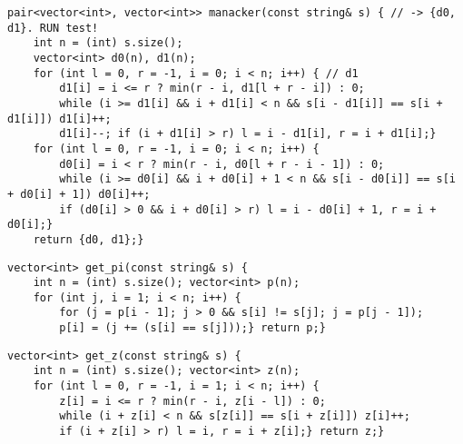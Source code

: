 \documentclass[12pt]{article}
\begin{document}
\begin{verbatim}
pair<vector<int>, vector<int>> manacker(const string& s) { // -> {d0, d1}. RUN test!
    int n = (int) s.size();
    vector<int> d0(n), d1(n);
    for (int l = 0, r = -1, i = 0; i < n; i++) { // d1
        d1[i] = i <= r ? min(r - i, d1[l + r - i]) : 0;
        while (i >= d1[i] && i + d1[i] < n && s[i - d1[i]] == s[i + d1[i]]) d1[i]++;
        d1[i]--; if (i + d1[i] > r) l = i - d1[i], r = i + d1[i];}
    for (int l = 0, r = -1, i = 0; i < n; i++) {
        d0[i] = i < r ? min(r - i, d0[l + r - i - 1]) : 0;
        while (i >= d0[i] && i + d0[i] + 1 < n && s[i - d0[i]] == s[i + d0[i] + 1]) d0[i]++;
        if (d0[i] > 0 && i + d0[i] > r) l = i - d0[i] + 1, r = i + d0[i];}
    return {d0, d1};}
\end{verbatim}

\begin{verbatim}
vector<int> get_pi(const string& s) {
    int n = (int) s.size(); vector<int> p(n);
    for (int j, i = 1; i < n; i++) {
        for (j = p[i - 1]; j > 0 && s[i] != s[j]; j = p[j - 1]);
        p[i] = (j += (s[i] == s[j]));} return p;}
\end{verbatim}

\begin{verbatim}
vector<int> get_z(const string& s) {
    int n = (int) s.size(); vector<int> z(n);
    for (int l = 0, r = -1, i = 1; i < n; i++) {
        z[i] = i <= r ? min(r - i, z[i - l]) : 0;
        while (i + z[i] < n && s[z[i]] == s[i + z[i]]) z[i]++;
        if (i + z[i] > r) l = i, r = i + z[i];} return z;}
\end{verbatim}
\end{document}
